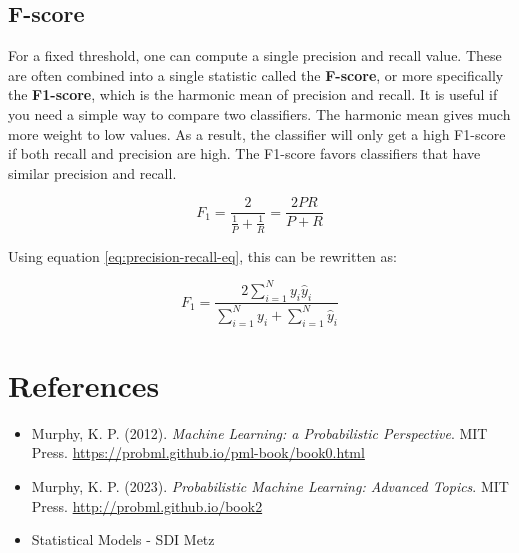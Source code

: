 \documentclass[12pt, a4paper]{article}
\theoremstyle{definition}
\numberwithin{figure}{section}
\numberwithin{equation}{section}
\numberwithin{table}{section}
\begin{document}
\subsection{F-score}

For a fixed threshold, one can compute a single precision and recall value. These are often combined into a single statistic called the \textbf{F-score}, or more specifically the \textbf{F1-score}, which is the harmonic mean of precision and recall. It is useful if you need a simple way to compare two classifiers. The harmonic mean gives much more weight to low values. As a result, the classifier will only get a high F1-score if both recall and precision are high. The F1-score favors classifiers that have similar precision and recall.

\begin{equation}
    F_1 = \frac{2}{\frac{1}{P}+\frac{1}{R}}=\frac{2PR}{P + R}
\end{equation}

Using equation \ref{eq:precision-recall-eq}, this can be rewritten as:

\begin{equation}
    F_1 = \frac{2 \sum_{i=1}^{N} y_i \hat{y}_i}{\sum_{i=1}^{N} y_i + \sum_{i=1}^{N} \hat{y}_i}
\end{equation}




% 

\newpage
\section{References}
\begin{itemize}
    \item Murphy, K. P. (2012). \textit{Machine Learning: a Probabilistic Perspective}. MIT Press. \url{https://probml.github.io/pml-book/book0.html}
    \item Murphy, K. P. (2023). \textit{Probabilistic Machine Learning: Advanced Topics}. MIT Press. \url{http://probml.github.io/book2}
    \item Statistical Models - SDI Metz
\end{itemize}
\end{document}
